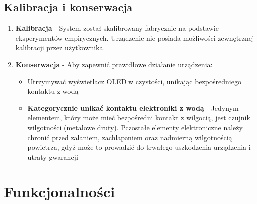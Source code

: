 \documentclass{article}
\begin{document}
\subsection{Kalibracja i konserwacja}
\begin{enumerate}
    \item \textbf{Kalibracja} - System został skalibrowany fabrycznie na podstawie eksperymentów empirycznych. Urządzenie nie posiada możliwości zewnętrznej kalibracji przez użytkownika.
    
    \item \textbf{Konserwacja} - Aby zapewnić prawidłowe działanie urządzenia:
    \begin{itemize}
        \item Utrzymywać wyświetlacz OLED w czystości, unikając bezpośredniego kontaktu z wodą
        \item \textbf{Kategorycznie unikać kontaktu elektroniki z wodą} - Jedynym elementem, który może mieć bezpośredni kontakt z wilgocią, jest czujnik wilgotności (metalowe druty). Pozostałe elementy elektroniczne należy chronić przed zalaniem, zachlapaniem oraz nadmierną wilgotnością powietrza, gdyż może to prowadzić do trwałego uszkodzenia urządzenia i utraty gwarancji
    \end{itemize}
\end{enumerate}



\section{Funkcjonalności}




















\end{document}

